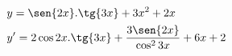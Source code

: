 \begin{ex}
\begin{align}
&y=\sen{2x}.\tg{3x}+3x^2+2x\nonumber\\
&y'=2\cos{2x}.\tg{3x}+\frac{3\sen{2x}}{\cos^2{3x}}+6x+2\nonumber
\end{align}
\end{ex}